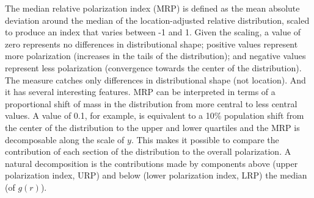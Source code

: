 \documentclass[twoside]{article}\usepackage[]{graphicx}\usepackage[]{color}
\begin{document}
\begin{multicols}{2}
The median relative polarization index (MRP) is defined as the mean absolute deviation around the median of the location-adjusted relative distribution, scaled to produce an index that varies between -1 and 1. Given the scaling, a value of zero represents no differences in distributional shape; positive values represent more polarization (increases in the tails of the distribution); and negative values represent less polarization (convergence towards the center of the distribution). The measure catches only differences in distributional shape (not location). And it has several interesting features. MRP can be interpreted in terms of a proportional shift of mass in the distribution from more central to less central values. A value of 0.1, for example, is equivalent to a 10\% population shift from the center of the distribution to the upper and lower quartiles and the MRP is decomposable along the scale of $y$. This makes it possible to compare the contribution of each section of the distribution to the overall polarization. A natural decomposition is the contributions made by components above (upper polarization index, URP) and below (lower polarization index, LRP) the median (of $g(r)$).









\end{multicols}
\end{document}
